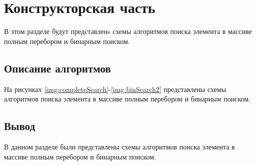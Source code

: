 \chapter{Конструкторская часть}
В этом разделе будут представленs схемы алгоритмов поиска элемента в массиве полным перебором и бинарным поиском.

\section{Описание алгоритмов}
На рисунках \ref{img:completeSearch}-\ref{img:binSearch2} представлены схемы алгоритмов поиска элемента в массиве полным перебором и бинарным поиском.

\clearpage

\clearpage


\section*{Вывод}

В данном разделе были представлены схемы алгоритмов поиска элемента в массиве полным перебором и бинарным поиском.

\clearpage
